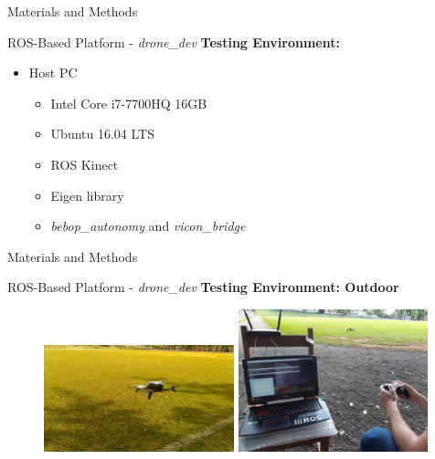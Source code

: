 
\begin{frame}{Materials and Methods}
\begin{block}{ROS-Based Platform - \textit{drone\_dev}}
	\textbf{Testing Environment:}
	\begin{itemize}
		\item Host PC
		\begin{itemize}
			\item Intel Core i7-7700HQ 16GB
			\item Ubuntu 16.04 LTS
			\item ROS Kinect
			\item Eigen library
			\item \textit{bebop\_autonomy} and \textit{vicon\_bridge} 
		\end{itemize}
	\end{itemize}
		
	
\end{block}
\end{frame}


\begin{frame}{Materials and Methods}
\begin{block}{ROS-Based Platform - \textit{drone\_dev}}
	\textbf{Testing Environment: Outdoor}
\begin{figure}[!h]
	\centering
	\includegraphics[width=5.5cm]{img/parrotOutdoor1.jpeg}
	\hspace{0.25cm}
	\includegraphics[width=5.5cm]{img/outdoorPC.jpg}
\end{figure}
	
	
\end{block}
\end{frame}

